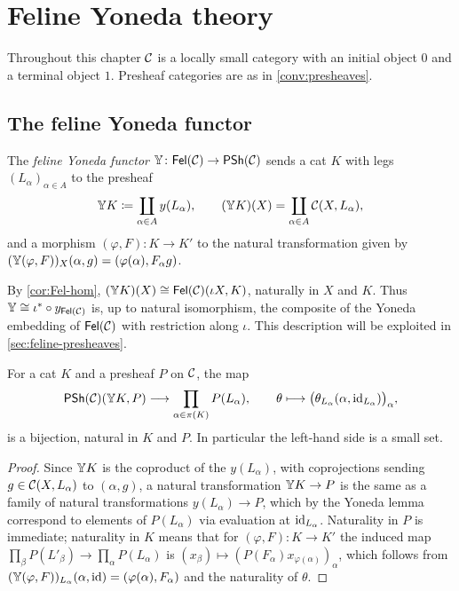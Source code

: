 \chapter{Feline Yoneda theory}\label{ch:yoneda}

\begin{assumption}\label{ass:ch8}
Throughout this chapter $\mathcal{C}$ is a locally small category with an initial
object $0$ and a terminal object $1$. Presheaf categories are as in
\cref{conv:presheaves}.
\end{assumption}

\section{The feline Yoneda functor}\label{sec:feline-yoneda}

\begin{definition}\label{def:feline-yoneda}
The \emph{feline Yoneda functor} $\mathbb{Y}\colon\mathsf{Fel}(\mathcal{C})\to\mathsf{PSh}(\mathcal{C})$ sends a cat
$K$ with legs $(L_\alpha)_{\alpha\in A}$ to the presheaf
\[
\mathbb{Y} K\coloneqq\coprod_{\alpha\in A}y(L_\alpha),\qquad
(\mathbb{Y} K)(X)=\coprod_{\alpha\in A}\mathcal{C}(X,L_\alpha),
\]
and a morphism $(\varphi,F)\colon K\to K'$ to the natural transformation
given by $(\mathbb{Y}(\varphi,F))_X(\alpha,g)=(\varphi(\alpha),F_\alpha g)$.
\end{definition}

\begin{remark}\label{rem:feline-yoneda-restriction}
By \cref{cor:Fel-hom}, $(\mathbb{Y} K)(X)\cong\mathsf{Fel}(\mathcal{C})(\iota X,K)$, naturally in $X$
and $K$. Thus $\mathbb{Y}\cong\iota^*\circ y_{\mathsf{Fel}(\mathcal{C})}$ is, up to natural isomorphism, the composite of the Yoneda
embedding of $\mathsf{Fel}(\mathcal{C})$ with restriction along $\iota$. This description
will be exploited in \cref{sec:feline-presheaves}.
\end{remark}

\begin{lemma}\label{lem:feline-yoneda-lemma}
For a cat $K$ and a presheaf $P$ on $\mathcal{C}$, the map
\[
\mathsf{PSh}(\mathcal{C})(\mathbb{Y} K,P)\longrightarrow\prod_{\alpha\in\pi(K)}P(L_\alpha),\qquad
\theta\longmapsto\bigl(\theta_{L_\alpha}(\alpha,\mathrm{id}_{L_\alpha})\bigr)_\alpha,
\]
is a bijection, natural in $K$ and $P$. In particular the left-hand side is a
small set.
\end{lemma}

\begin{proof}
Since $\mathbb{Y} K$ is the coproduct of the $y(L_\alpha)$, with coprojections
sending $g\in\mathcal{C}(X,L_\alpha)$ to $(\alpha,g)$, a natural transformation
$\mathbb{Y} K\to P$ is the same as a family of natural transformations
$y(L_\alpha)\to P$, which by the Yoneda lemma correspond to elements of
$P(L_\alpha)$ via evaluation at $\mathrm{id}_{L_\alpha}$. Naturality in $P$ is
immediate; naturality in $K$ means that for $(\varphi,F)\colon K\to K'$ the
induced map $\prod_\beta P(L'_\beta)\to\prod_\alpha P(L_\alpha)$ is
$(x_\beta)\mapsto(P(F_\alpha)x_{\varphi(\alpha)})_\alpha$, which follows from
$(\mathbb{Y}(\varphi,F))_{L_\alpha}(\alpha,\mathrm{id})=(\varphi(\alpha),F_\alpha)$ and the
naturality of $\theta$.
\end{proof}

